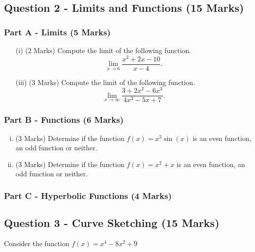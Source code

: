 ﻿ \documentclass[a4paper,12pt]{article}
\begin{document}
\bigskip
\subsection*{Question 2 - Limits and Functions (15 Marks)}
\subsubsection*{Part A - Limits (5 Marks)}
\begin{enumerate}
	\item[(i)] (2 Marks)  Compute the limit of the following function.
		{
			\large
	\[\lim_{x \to 6 } \frac{x^2 + 2x-10}{x-4}.\]
}
	\bigskip
	
	\item[(iii)] (3 Marks) Compute the limit of the following function.
		{
			\large
	\[ \lim_{x \to \infty } \frac{3 + 2x^2 - 6x^3 }{4x^3 - 5x + 7}. \]	
}
\end{enumerate}
\medskip
\subsubsection*{Part B - Functions (6 Marks)}
\begin{enumerate}[(i)]
	\item (3 Marks) Determine if the function $f(x) = x^3\sin(x)$ is an even function, an odd function or neither.
	\bigskip
		\item (3 Marks) Determine if the function $f(x) = x^2+x$ is an even function, an odd function or neither.
		\bigskip
\end{enumerate}
\medskip
\subsubsection*{Part C - Hyperbolic Functions (4 Marks)}




\bigskip
\subsection*{Question 3 - Curve Sketching (15 Marks)}
Consider the function $f(x) = x^4 -  8x^2 + 9$
\end{document}
